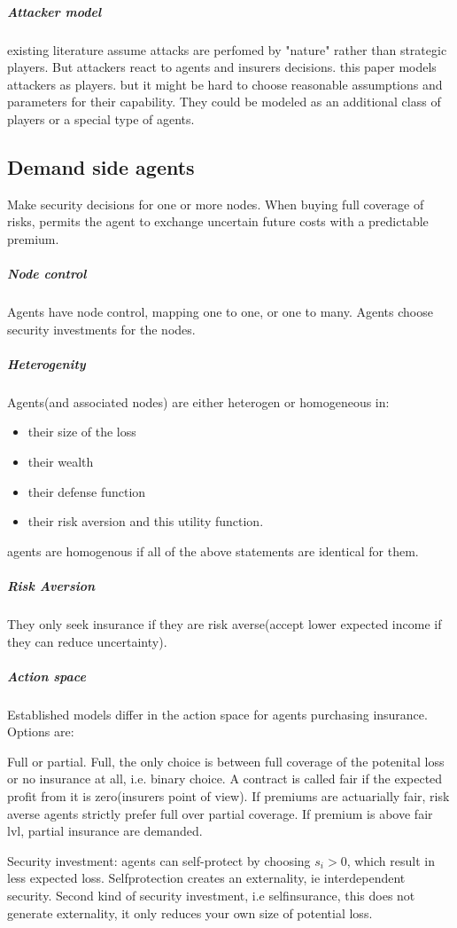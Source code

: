 \subparagraph{Attacker model}
existing literature assume attacks are perfomed by "nature" rather than strategic players.
 But attackers react to agents and insurers decisions. this paper models attackers as
  players. but it might be hard to choose reasonable assumptions and parameters for their capability. They could be modeled as an additional class of players or a special type of agents.
\subsection{Demand side agents}
Make security decisions for one or more nodes. When buying full coverage of risks, permits
 the agent to exchange uncertain future costs with a predictable premium. 
 \subparagraph{Node control}
 
Agents have node control, mapping one to one, or one to many. Agents choose security investments for the nodes.
\subparagraph{Heterogenity}
 Agents(and associated nodes) are either heterogen or homogeneous in:
\begin{itemize}
\item  their size of the loss
\item  their wealth
\item  their defense function
\item   their risk aversion and this utility function.
\end{itemize}
agents are homogenous if all of the above statements are identical for them.
\subparagraph{Risk Aversion} 
 They only seek insurance if they are risk averse(accept lower expected income if they can reduce uncertainty).
\subparagraph{Action space}
 Established models differ in the action space for agents purchasing insurance.
 Options are:
 
 Full or partial. Full, the only choice is between full coverage of the potenital loss or no insurance at all, i.e. binary choice.
A contract is called fair if the expected profit from it is zero(insurers point of view).
 If premiums are actuarially fair, risk averse agents strictly prefer full over partial coverage. 
If premium is above fair lvl, partial insurance are demanded. 

Security investment: agents can self-protect by choosing $s_{i}>0$, which result in less expected loss. 
Selfprotection creates an externality, ie interdependent security.
Second kind of security investment, i.e selfinsurance, this does not generate externality, 
it only reduces your own size of potential loss. 

